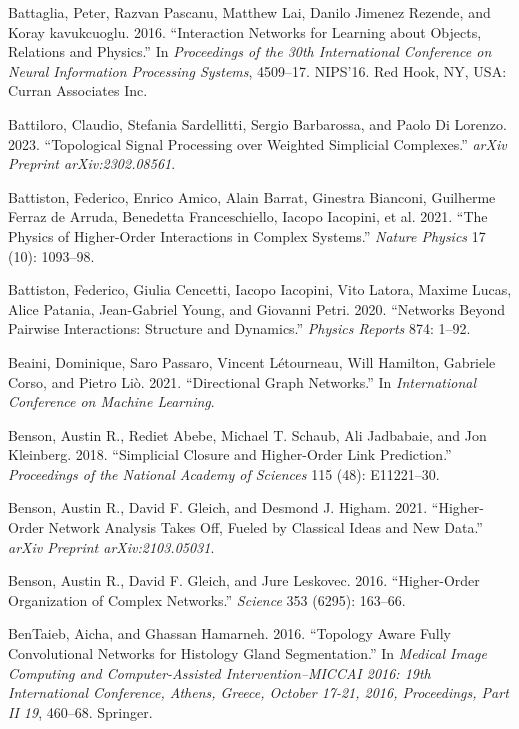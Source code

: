 \documentclass[
  12pt,
]{krantz}
\newlength{\cslhangindent}
\newenvironment{CSLReferences}[2] %
 {\begin{list}{}{%
  \setlength{\itemindent}{0pt}
  \setlength{\leftmargin}{0pt}
  \setlength{\parsep}{0pt}
  \ifodd #1
   \setlength{\leftmargin}{\cslhangindent}
   \setlength{\itemindent}{-1\cslhangindent}
  \fi
  \setlength{\itemsep}{#2\baselineskip}}}
 {\end{list}}
\begin{document}
\begin{CSLReferences}{1}{0}
Battaglia, Peter, Razvan Pascanu, Matthew Lai, Danilo Jimenez Rezende,
and Koray kavukcuoglu. 2016. {``Interaction Networks for Learning about
Objects, Relations and Physics.''} In \emph{Proceedings of the 30th
International Conference on Neural Information Processing Systems},
4509--17. NIPS'16. Red Hook, NY, USA: Curran Associates Inc.

Battiloro, Claudio, Stefania Sardellitti, Sergio Barbarossa, and Paolo
Di Lorenzo. 2023. {``Topological Signal Processing over Weighted
Simplicial Complexes.''} \emph{arXiv Preprint arXiv:2302.08561}.

Battiston, Federico, Enrico Amico, Alain Barrat, Ginestra Bianconi,
Guilherme Ferraz de Arruda, Benedetta Franceschiello, Iacopo Iacopini,
et al. 2021. {``The Physics of Higher-Order Interactions in Complex
Systems.''} \emph{Nature Physics} 17 (10): 1093--98.

Battiston, Federico, Giulia Cencetti, Iacopo Iacopini, Vito Latora,
Maxime Lucas, Alice Patania, Jean-Gabriel Young, and Giovanni Petri.
2020. {``Networks Beyond Pairwise Interactions: Structure and
Dynamics.''} \emph{Physics Reports} 874: 1--92.

Beaini, Dominique, Saro Passaro, Vincent Létourneau, Will Hamilton,
Gabriele Corso, and Pietro Liò. 2021. {``Directional Graph Networks.''}
In \emph{International Conference on Machine Learning}.

Benson, Austin R., Rediet Abebe, Michael T. Schaub, Ali Jadbabaie, and
Jon Kleinberg. 2018. {``Simplicial Closure and Higher-Order Link
Prediction.''} \emph{Proceedings of the National Academy of Sciences}
115 (48): E11221--30.

Benson, Austin R., David F. Gleich, and Desmond J. Higham. 2021.
{``Higher-Order Network Analysis Takes Off, Fueled by Classical Ideas
and New Data.''} \emph{arXiv Preprint arXiv:2103.05031}.

Benson, Austin R., David F. Gleich, and Jure Leskovec. 2016.
{``Higher-Order Organization of Complex Networks.''} \emph{Science} 353
(6295): 163--66.

BenTaieb, Aicha, and Ghassan Hamarneh. 2016. {``Topology Aware Fully
Convolutional Networks for Histology Gland Segmentation.''} In
\emph{Medical Image Computing and Computer-Assisted Intervention--MICCAI
2016: 19th International Conference, Athens, Greece, October 17-21,
2016, Proceedings, Part II 19}, 460--68. Springer.


\end{CSLReferences}
\end{document}
